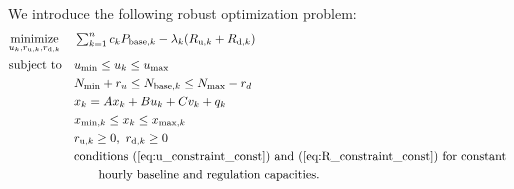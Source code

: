 We introduce the following robust optimization problem:
\begin{equation}\label{eq:opt}
\begin{aligned}
& \underset{u_k, r_{\text{u},k}, r_{\text{d},k}}{\text{minimize}} 
& & \textstyle\sum_{k=1}^{n} c_k P_{\text{base},k} - \lambda_k (R_{\text{u},k} + R_{\text{d},k}) \\
& \text{subject to}
& & u_{\text{min}} \leq u_{k} \leq u_{\text{max}} \\%
&&& N_{\text{min}} + r_u \leq N_{\text{base},k} \leq N_{\text{max}} - r_d \\
&&& x_k = Ax_k + Bu_k + Cv_k + q_k \\
&&& x_{\text{min},k} \leq x_{k} \leq x_{\text{max},k}  \\
&&& r_{\text{u},k} \geq 0, ~r_{\text{d},k} \geq 0\\
&&& \text{conditions~} (\ref{eq:u_constraint_const}) \text{~and~} (\ref{eq:R_constraint_const}) \text{~for constant }\\
&&& \quad\quad \text{hourly baseline and regulation capacities}.
\end{aligned}
\end{equation}

